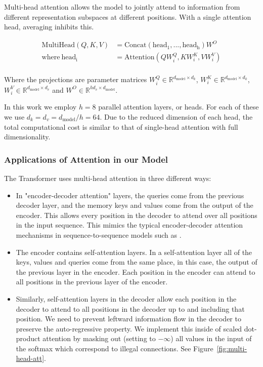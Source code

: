 \documentclass{article}
\newcommand{\dmodel}{d_{\text{model}}}
\begin{document}
Multi-head attention allows the model to jointly attend to information from different representation subspaces at different positions. With a single attention head, averaging inhibits this.

\begin{align*}
    \mathrm{MultiHead}(Q, K, V) &= \mathrm{Concat}(\mathrm{head_1}, ..., \mathrm{head_h})W^O\\
\text{where}~\mathrm{head_i} &= \mathrm{Attention}(QW^Q_i, KW^K_i, VW^V_i)\\
\end{align*}

Where the projections are parameter matrices $W^Q_i \in \mathbb{R}^{\dmodel \times d_k}$, $W^K_i \in \mathbb{R}^{\dmodel \times d_k}$, $W^V_i \in \mathbb{R}^{\dmodel \times d_v}$ and $W^O \in \mathbb{R}^{hd_v \times \dmodel}$.




In this work we employ $h=8$ parallel attention layers, or heads. For each of these we use $d_k=d_v=\dmodel/h=64$.
Due to the reduced dimension of each head, the total computational cost is similar to that of single-head attention with full dimensionality.

\subsubsection{Applications of Attention in our Model}

The Transformer uses multi-head attention in three different ways: 
\begin{itemize}
 \item In "encoder-decoder attention" layers, the queries come from the previous decoder layer, and the memory keys and values come from the output of the encoder.   This allows every position in the decoder to attend over all positions in the input sequence.  This mimics the typical encoder-decoder attention mechanisms in sequence-to-sequence models such as \citep{wu2016google, bahdanau2014neural,JonasFaceNet2017}.

 \item The encoder contains self-attention layers.  In a self-attention layer all of the keys, values and queries come from the same place, in this case, the output of the previous layer in the encoder.   Each position in the encoder can attend to all positions in the previous layer of the encoder.

 \item Similarly, self-attention layers in the decoder allow each position in the decoder to attend to all positions in the decoder up to and including that position.  We need to prevent leftward information flow in the decoder to preserve the auto-regressive property.  We implement this inside of scaled dot-product attention by masking out (setting to $-\infty$) all values in the input of the softmax which correspond to illegal connections.  See Figure~\ref{fig:multi-head-att}.

\end{itemize}
\end{document}
